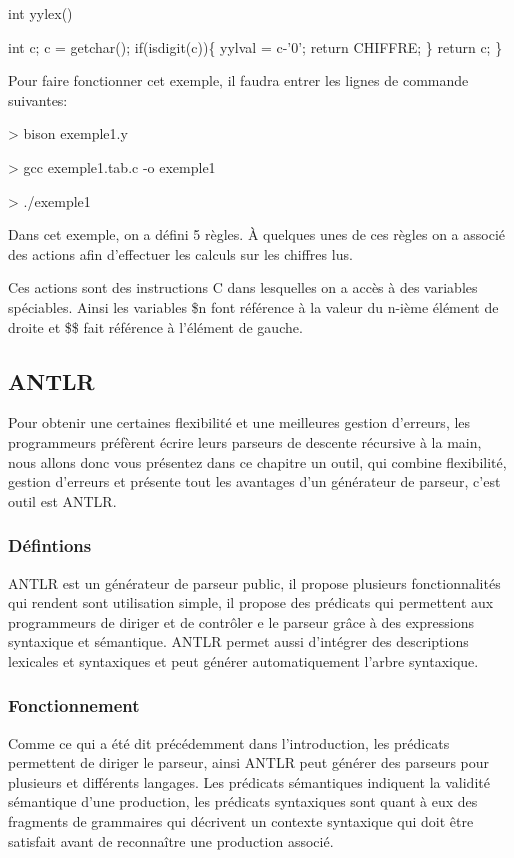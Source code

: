 \documentclass{article}
\begin{document}
int yylex()\\{
    int c;
    c = getchar();
    if(isdigit(c))\{
        yylval = c-'0';
        return CHIFFRE;
    \}
    return c;
\}

Pour faire fonctionner cet exemple, il faudra entrer les lignes de commande suivantes:

> bison exemple1.y

> gcc exemple1.tab.c -o exemple1

> ./exemple1

Dans cet exemple, on a défini 5 règles. À quelques unes de ces règles on a associé des actions afin d’effectuer les calculs sur les chiffres lus.

Ces actions sont des instructions C dans lesquelles on a accès à des variables spéciables.
Ainsi les variables \$n font référence à la valeur du n-ième élément de droite et \$\$ fait référence à l’élément de gauche.

\subsection{ANTLR}
Pour obtenir une certaines flexibilité et une meilleures gestion d’erreurs, les programmeurs préfèrent écrire leurs parseurs de descente récursive à la main, nous allons donc vous présentez dans ce chapitre un outil, qui combine flexibilité, gestion d’erreurs  et présente tout les avantages d’un générateur de parseur, c’est outil est ANTLR.
\subsubsection{Défintions}
ANTLR \cite{refANTLR} est un générateur de parseur public, il propose plusieurs fonctionnalités qui rendent sont utilisation simple, il propose  des prédicats qui permettent aux programmeurs de diriger et de contrôler e le parseur grâce à des expressions syntaxique et sémantique.
ANTLR permet aussi d’intégrer des  descriptions lexicales et syntaxiques  et peut générer automatiquement l’arbre syntaxique.
\subsubsection{Fonctionnement}
Comme ce qui a été dit précédemment dans l’introduction, les prédicats permettent de diriger le parseur, ainsi ANTLR peut générer des parseurs pour plusieurs et différents langages.
Les prédicats sémantiques indiquent la validité sémantique d’une production, les prédicats syntaxiques sont quant à eux des fragments de grammaires qui décrivent un contexte syntaxique qui doit être satisfait avant de reconnaître une production associé.
}
\end{document}
